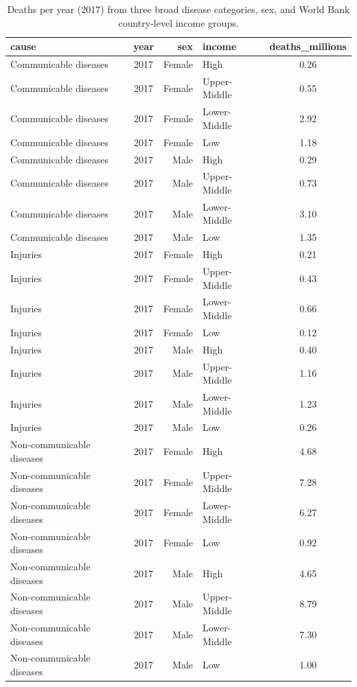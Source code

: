 \documentclass[
  12pt,
  krantz2]{krantz}
\begin{document}
\begin{table}[!h]

\caption{\label{tab:chap3-tab-gbd2017}Deaths per year (2017) from three broad disease categories, sex, and World Bank country-level income groups.}
\centering
\fontsize{10}{12}\selectfont
\begin{tabular}[t]{lcrlc}
\toprule
cause & year & sex & income & deaths\_millions\\
\midrule
Communicable diseases & 2017 & Female & High & 0.26\\
Communicable diseases & 2017 & Female & Upper-Middle & 0.55\\
Communicable diseases & 2017 & Female & Lower-Middle & 2.92\\
Communicable diseases & 2017 & Female & Low & 1.18\\
\addlinespace
Communicable diseases & 2017 & Male & High & 0.29\\
Communicable diseases & 2017 & Male & Upper-Middle & 0.73\\
Communicable diseases & 2017 & Male & Lower-Middle & 3.10\\
Communicable diseases & 2017 & Male & Low & 1.35\\
\addlinespace
Injuries & 2017 & Female & High & 0.21\\
Injuries & 2017 & Female & Upper-Middle & 0.43\\
Injuries & 2017 & Female & Lower-Middle & 0.66\\
Injuries & 2017 & Female & Low & 0.12\\
\addlinespace
Injuries & 2017 & Male & High & 0.40\\
Injuries & 2017 & Male & Upper-Middle & 1.16\\
Injuries & 2017 & Male & Lower-Middle & 1.23\\
Injuries & 2017 & Male & Low & 0.26\\
\addlinespace
Non-communicable diseases & 2017 & Female & High & 4.68\\
Non-communicable diseases & 2017 & Female & Upper-Middle & 7.28\\
Non-communicable diseases & 2017 & Female & Lower-Middle & 6.27\\
Non-communicable diseases & 2017 & Female & Low & 0.92\\
\addlinespace
Non-communicable diseases & 2017 & Male & High & 4.65\\
Non-communicable diseases & 2017 & Male & Upper-Middle & 8.79\\
Non-communicable diseases & 2017 & Male & Lower-Middle & 7.30\\
Non-communicable diseases & 2017 & Male & Low & 1.00\\
\bottomrule
\end{tabular}
\end{table}
\end{document}
